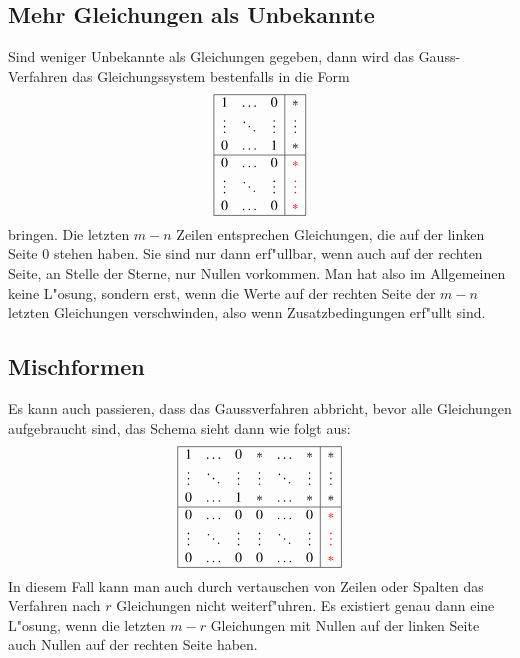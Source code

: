 \subsection{Mehr Gleichungen als Unbekannte}
Sind weniger Unbekannte als Gleichungen gegeben, dann wird das Gauss-Verfahren
das Gleichungssystem bestenfalls in die Form
$$
\begin{array}{|ccc|c|}
\hline
1&\dots&0&*\\
\vdots&\ddots&\vdots&\vdots\\
0&\dots&1&*\\
\hline
0&\dots&0&\color{red}*\\
\vdots&\ddots&\vdots&\color{red}\vdots\\
0&\dots&0&\color{red}*\\
\hline
\end{array}
$$
bringen. Die letzten $m-n$ Zeilen entsprechen Gleichungen, die auf
der linken Seite $0$ stehen haben. Sie sind nur dann erf"ullbar, wenn
auch auf der rechten Seite, an Stelle der Sterne, nur Nullen vorkommen.
Man hat also im Allgemeinen keine L"osung, sondern erst, wenn die Werte
auf der rechten Seite der $m-n$ letzten Gleichungen verschwinden,
also wenn Zusatzbedingungen erf"ullt sind.

\subsection{Mischformen}
Es kann auch passieren, dass das Gaussverfahren abbricht, bevor alle
Gleichungen aufgebraucht sind, das Schema sieht dann wie folgt aus:
\begin{equation}
\begin{array}{|cccccc|c|}
\hline
1&\dots&0 &*&\dots&*&*\\
\vdots&\ddots&\vdots &\vdots&\ddots&\vdots&\vdots\\
0&\dots&1 &*&\dots&*&*\\
\hline
0&\dots&0 &0&\dots&0&\color{red}*\\
\vdots&\ddots&\vdots &\vdots&\ddots&\vdots&\color{red}\vdots\\
0&\dots&0 &0&\dots&0&\color{red}*\\
\hline
\end{array}
\label{rangdef}
\end{equation}
In diesem Fall kann man auch durch vertauschen von Zeilen oder Spalten
das Verfahren nach $r$ Gleichungen nicht weiterf"uhren. 
Es existiert genau dann eine L"osung, wenn die letzten $m-r$ Gleichungen
mit Nullen auf der linken Seite auch Nullen auf der
rechten Seite haben.

